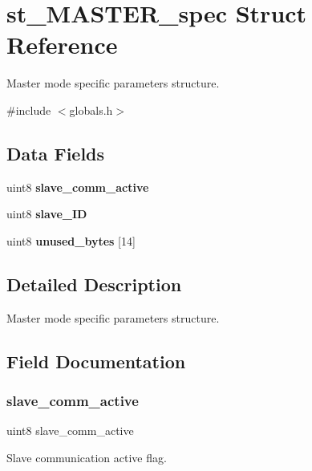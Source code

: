 \section{st\+\_\+\+M\+A\+S\+T\+E\+R\+\_\+spec Struct Reference}
\label{structst___m_a_s_t_e_r__spec}


Master mode specific parameters structure.  




{\ttfamily \#include $<$globals.\+h$>$}

\subsection*{Data Fields}
\begin{DoxyCompactItemize}
\item 
uint8 \textbf{ slave\+\_\+comm\+\_\+active}
\item 
uint8 \textbf{ slave\+\_\+\+ID}
\item 
uint8 \textbf{ unused\+\_\+bytes} [14]
\end{DoxyCompactItemize}


\subsection{Detailed Description}
Master mode specific parameters structure. 



\subsection{Field Documentation}
\mbox{\label{structst___m_a_s_t_e_r__spec_a376f5666accfc7dcbc269b1c2a38d682}} 
\subsubsection{slave\+\_\+comm\+\_\+active}
{\footnotesize\ttfamily uint8 slave\+\_\+comm\+\_\+active}

Slave communication active flag. \mbox{\label{structst___m_a_s_t_e_r__spec_a63f688b8daad4cd16c7ec5b44ef20778}} 
